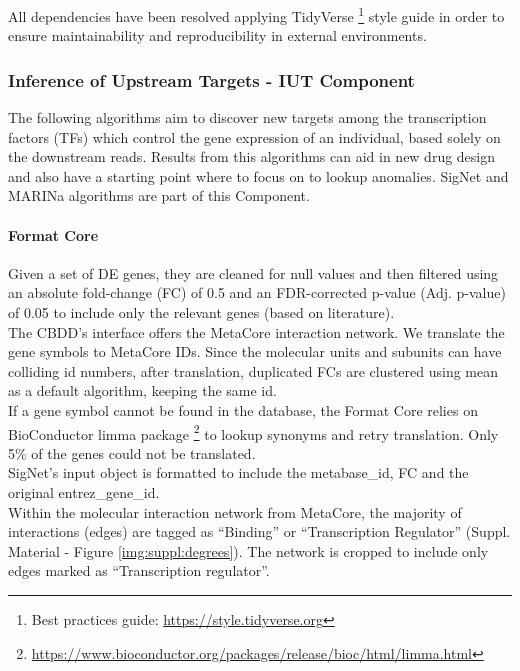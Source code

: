 All dependencies have been resolved applying TidyVerse \footnote{Best practices guide: \url{https://style.tidyverse.org}} style guide in order to ensure maintainability and reproducibility in external environments.

\subsubsection{Inference of Upstream Targets - IUT Component}
The following algorithms aim to discover new targets among the transcription factors (TFs) which control the gene expression of an individual, based solely on the downstream reads. Results from this algorithms can aid in new drug design and also have a starting point where to focus on to lookup anomalies. SigNet and MARINa algorithms are part of this Component.

\paragraph{Format Core}
\label{section:iut-f}
Given a set of DE genes, they are cleaned for null values and then filtered using an absolute fold-change (FC) of 0.5 and an FDR-corrected p-value (Adj. p-value) of 0.05 to include only the relevant genes (based on literature).
\\

The CBDD's interface offers the MetaCore interaction network. We translate the gene symbols to MetaCore IDs. Since the molecular units and subunits can have colliding id numbers, after translation, duplicated FCs are clustered using mean as a default algorithm, keeping the same id.
\\

If a gene symbol cannot be found in the database, the Format Core relies on BioConductor limma package \footnote{\url{https://www.bioconductor.org/packages/release/bioc/html/limma.html}} to lookup synonyms and retry translation. Only 5\% of the genes could not be translated.
\\

SigNet’s input object is formatted to include the metabase\_id, FC and the original entrez\_gene\_id.
\\

Within the molecular interaction network from MetaCore, the majority of interactions (edges) are tagged as “Binding” or “Transcription Regulator” (Suppl. Material - Figure \ref{img:suppl:degrees}). The network is cropped to include only edges marked as “Transcription regulator”.

